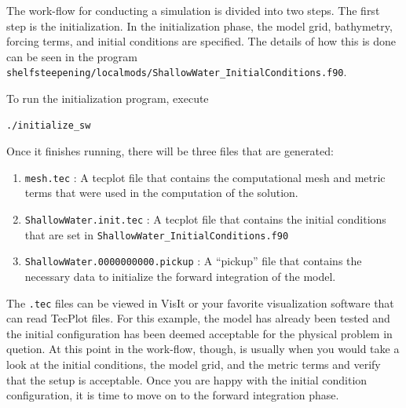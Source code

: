 \documentclass{softwaremanual}
\begin{document}
The work-flow for conducting a simulation is divided into two steps. The first step is the initialization. In the initialization phase, the model grid, bathymetry, forcing terms, and initial conditions are specified. The details of how this is done can be seen in the program \texttt{shelfsteepening/localmods/ShallowWater\_InitialConditions.f90}. 

To run the initialization program, execute
\begin{verbatim}
./initialize_sw
\end{verbatim}
 Once it finishes running, there will be three files that are generated:
\begin{enumerate}
\item \texttt{mesh.tec} : A tecplot file that contains the computational mesh and metric terms that were used in the computation of the solution.
\item \texttt{ShallowWater.init.tec} : A tecplot file that contains the initial conditions that are set in \texttt{ShallowWater\_InitialConditions.f90}
\item \texttt{ShallowWater.0000000000.pickup} : A ``pickup'' file that contains the necessary data to initialize the forward integration of the model.
\end{enumerate}

The \texttt{.tec} files can be viewed in VisIt or your favorite visualization software that can read TecPlot files. For this example, the model has already been tested and the initial configuration has been deemed acceptable for the physical problem in quetion. At this point in the work-flow, though, is usually when you would take a look at the initial conditions, the model grid, and the metric terms and verify that the setup is acceptable. Once you are happy with the initial condition configuration, it is time to move on to the forward integration phase.
\end{document}
